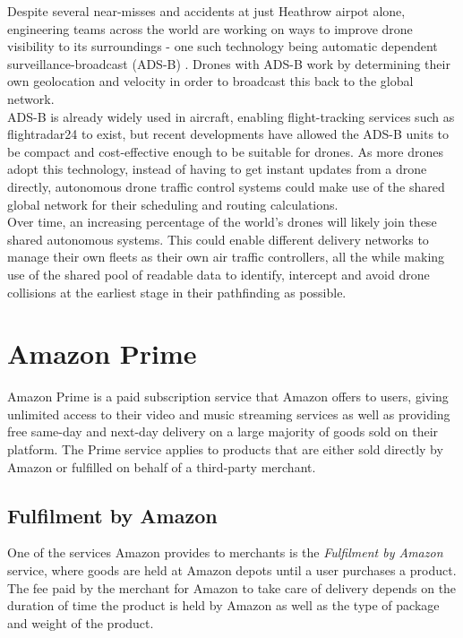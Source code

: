 \documentclass[a4paper,11pt,titlepage]{report}
\begin{document}
Despite several near-misses \cite{Davies2017} and accidents\cite{BBCNews2016} at just Heathrow airpot alone, engineering teams across the world are working on ways to improve drone visibility to its surroundings - one such technology being automatic dependent surveillance-broadcast (ADS-B) \cite{Dillow2015}. Drones with ADS-B work by determining their own geolocation and velocity in order to broadcast this back to the global network.\\

ADS-B is already widely used in aircraft, enabling flight-tracking services such as flightradar24 to exist\cite{Flightradar242018}, but recent developments have allowed the ADS-B units to be compact and cost-effective enough to be suitable for drones. As more drones adopt this technology, instead of having to get instant updates from a drone directly, autonomous drone traffic control systems could make use of the shared global network for their scheduling and routing calculations. \\

Over time, an increasing percentage of the world's drones will likely join these shared autonomous systems. This could enable different delivery networks to manage their own fleets as their own air traffic controllers, all the while making use of the shared pool of readable data to identify, intercept and avoid drone collisions at the earliest stage in their pathfinding as possible.

\section{Amazon Prime}
Amazon Prime is a paid subscription service that Amazon offers to users, giving unlimited access to their video and music streaming services as well as providing free same-day and next-day delivery on a large majority of goods sold on their platform. The Prime service applies to products that are either sold directly by Amazon or fulfilled on behalf of a third-party merchant.

\subsection{Fulfilment by Amazon}
One of the services Amazon provides to merchants is the \textit{Fulfilment by Amazon} service, where goods are held at Amazon depots until a user purchases a product. The fee paid by the merchant for Amazon to take care of delivery depends on the duration of time the product is held by Amazon as well as the type of package and weight of the product.
\end{document}
